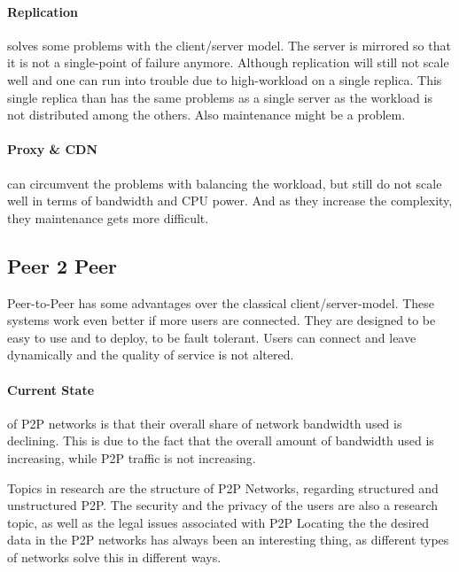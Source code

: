 \paragraph{Replication} %
\label{par:replication}
solves some problems with the client/server model.
The server is mirrored so that it is not a single-point of failure anymore.
Although replication will still not scale well
and one can run into trouble due to high-workload on a single replica.
This single replica than has the same problems as a single server
as the workload is not distributed among the others.
Also maintenance might be a problem.

\paragraph{Proxy \& CDN} %
\label{par:proxy_&_cdn}
can circumvent the problems with balancing the workload,
but still do not scale well in terms of bandwidth and CPU power.
And as they increase the complexity,
they maintenance gets more difficult.

\subsection{Peer 2 Peer} %
\label{sub:peer_2_peer}
Peer-to-Peer has some advantages over the classical client/server-model.
These systems work even better if more users are connected.
They are designed to be easy to use and to deploy,
to be fault tolerant.
Users can connect and leave dynamically and the quality of service is not altered.

\paragraph{Current State}
of P2P networks is that their overall share of network bandwidth used is declining.
This is due to the fact that the overall amount of bandwidth used is increasing,
while P2P traffic is not increasing.

Topics in research are the structure of P2P Networks,
regarding structured and unstructured P2P.
The security and the privacy of the users are also a research topic,
as well as the legal issues associated with P2P
Locating the the desired data in the P2P networks has always been an interesting thing,
as different types of networks solve this in different ways.

